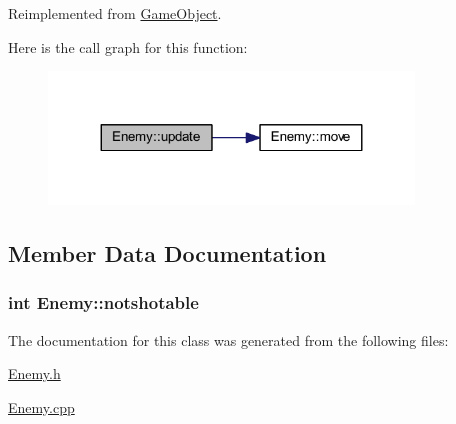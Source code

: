 Reimplemented from \hyperlink{class_game_object_ad4a07f19f6c5e2e71c89c07486f26244}{Game\+Object}.



Here is the call graph for this function\+:
\nopagebreak
\begin{figure}[H]
\begin{center}
\leavevmode
\includegraphics[width=275pt]{class_enemy_aa70d742da02995011f1618acc9e303db_cgraph}
\end{center}
\end{figure}




\subsection{Member Data Documentation}
\hypertarget{class_enemy_a330c49a49d5c017292a6ab66678f853a}{}
\subsubsection[{notshotable}]{\setlength{\rightskip}{0pt plus 5cm}int Enemy\+::notshotable}\label{class_enemy_a330c49a49d5c017292a6ab66678f853a}


The documentation for this class was generated from the following files\+:\begin{DoxyCompactItemize}
\item 
\hyperlink{_enemy_8h}{Enemy.\+h}\item 
\hyperlink{_enemy_8cpp}{Enemy.\+cpp}\end{DoxyCompactItemize}
